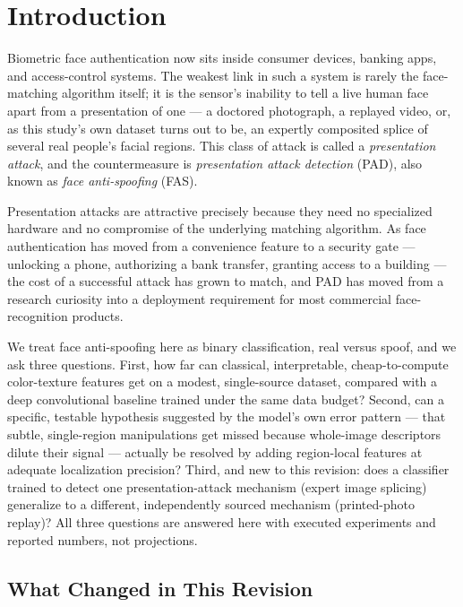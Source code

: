\documentclass[11pt]{article}
\begin{document}
\section{Introduction}

Biometric face authentication now sits inside consumer devices, banking apps, and access-control systems. The weakest link in such a system is rarely the face-matching algorithm itself; it is the sensor's inability to tell a live human face apart from a presentation of one --- a doctored photograph, a replayed video, or, as this study's own dataset turns out to be, an expertly composited splice of several real people's facial regions. This class of attack is called a \emph{presentation attack}, and the countermeasure is \emph{presentation attack detection} (PAD), also known as \emph{face anti-spoofing} (FAS).

Presentation attacks are attractive precisely because they need no specialized hardware and no compromise of the underlying matching algorithm. As face authentication has moved from a convenience feature to a security gate --- unlocking a phone, authorizing a bank transfer, granting access to a building --- the cost of a successful attack has grown to match, and PAD has moved from a research curiosity into a deployment requirement for most commercial face-recognition products.

We treat face anti-spoofing here as binary classification, real versus spoof, and we ask three questions. First, how far can classical, interpretable, cheap-to-compute color-texture features get on a modest, single-source dataset, compared with a deep convolutional baseline trained under the same data budget? Second, can a specific, testable hypothesis suggested by the model's own error pattern --- that subtle, single-region manipulations get missed because whole-image descriptors dilute their signal --- actually be resolved by adding region-local features at adequate localization precision? Third, and new to this revision: does a classifier trained to detect one presentation-attack mechanism (expert image splicing) generalize to a different, independently sourced mechanism (printed-photo replay)? All three questions are answered here with executed experiments and reported numbers, not projections.

\subsection{What Changed in This Revision}
\end{document}
